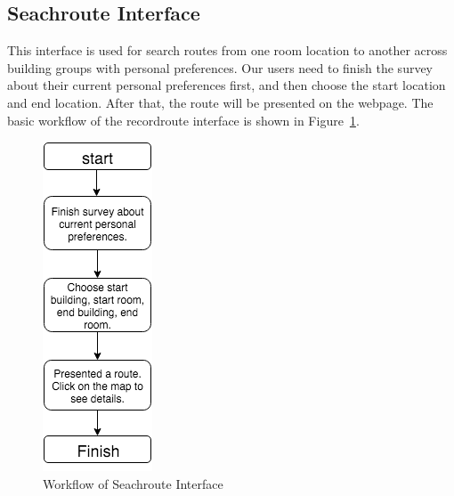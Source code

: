 \documentclass{sigchi}
\begin{document}
\subsection{Seachroute Interface}
This interface is used for search routes from one room location to another across building groups with personal preferences. Our users need to finish the survey about their current personal preferences first, and then choose the start location and end location. After that, the route will be presented on the webpage. The basic workflow of the recordroute interface is shown in Figure~\ref{fig:find-uiflow}.

\begin{figure}[!h]
\centering
\includegraphics[width=0.6\columnwidth]{pics/find-uiflow.png}
\caption{Workflow of Seachroute Interface}
\label{fig:find-uiflow}
\end{figure}
\end{document}
